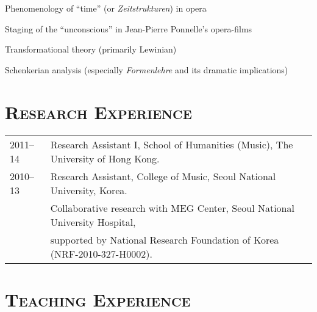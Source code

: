 \documentclass[a4,11pt,draft]{article}
\begin{document}
  \hspace{2mm} \textbullet \hspace{2mm} Phenomenology of ``time'' (or \textit{Zeitstrukturen}) in opera
  
  
  \noindent \hspace{2mm} \textbullet \hspace{2mm} Staging of the ``unconscious'' in Jean-Pierre Ponnelle's opera-films
  
  \noindent \hspace{2mm} \textbullet \hspace{2mm} Transformational theory (primarily Lewinian)
  
  \noindent \hspace{2mm} \textbullet \hspace{2mm} Schenkerian analysis (especially \textit{Formenlehre} and its dramatic implications)
  
  \section*{\textsc{Research Experience}}
  
  \hspace*{-0.25cm}
  \begin{tabular}{p{2.5cm} l}
    2011--14 & Research Assistant I, School of Humanities (Music), The University of Hong Kong.\\[2mm]
    
    2010--13 & Research Assistant, College of Music, Seoul National University, Korea.\\
    & Collaborative research with MEG Center, Seoul National University Hospital,\\
    & supported by National Research Foundation of Korea (NRF-2010-327-H0002).
  \end{tabular}
  
  \vspace*{2.5mm}
  
  \section*{\textsc{Teaching Experience}}
  
\end{document}
